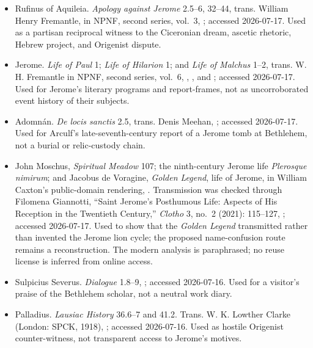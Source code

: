 \begin{itemize}
; and Jerome,
Letters --
; accessed
2026-07-17. Used for the reported 416 attack; their convergence does not supply
a casualty register, complete legal dossier, or neutral attribution of
perpetrators and command.
\item Rufinus of Aquileia. \emph{Apology against Jerome} 2.5--6, 32--44,
trans. William Henry Fremantle, in NPNF, second series, vol.~3,
; accessed 2026-07-17. Used as a partisan reciprocal witness to the
Ciceronian dream, ascetic rhetoric, Hebrew project, and Origenist dispute.
\item Jerome. \emph{Life of Paul} 1; \emph{Life of Hilarion} 1; and
\emph{Life of Malchus} 1--2, trans. W. H. Fremantle in NPNF, second series,
vol.~6,
,
, and
; accessed
2026-07-17. Used for Jerome's literary programs and report-frames, not as
uncorroborated event history of their subjects.
\item Adomn\'an. \emph{De locis sanctis} 2.5, trans. Denis Meehan,
; accessed
2026-07-17. Used for Arculf's late-seventh-century report of a Jerome tomb at
Bethlehem, not a burial or relic-custody chain.
\item John Moschus, \emph{Spiritual Meadow} 107; the ninth-century Jerome life
\emph{Plerosque nimirum}; and Jacobus de Voragine, \emph{Golden Legend}, life
of Jerome, in William Caxton's public-domain rendering,
. Transmission was checked through Filomena Giannotti, ``Saint Jerome's
Posthumous Life: Aspects of His Reception in the Twentieth Century,''
\emph{Clotho} 3, no.~2 (2021): 115--127,
;
accessed 2026-07-17. Used to show that the \emph{Golden Legend} transmitted
rather than invented the Jerome lion cycle; the proposed name-confusion route
remains a reconstruction. The modern analysis is paraphrased; no reuse license
is inferred from online access.
\item Sulpicius Severus. \emph{Dialogue} 1.8--9,
; accessed 2026-07-16. Used for a visitor's praise of the Bethlehem
scholar, not a neutral work diary.
\item Palladius. \emph{Lausiac History} 36.6--7 and 41.2. Trans. W. K.
Lowther Clarke (London: SPCK, 1918),
; accessed 2026-07-16. Used as hostile Origenist counter-witness,
not transparent access to Jerome's motives.
\end{itemize}

